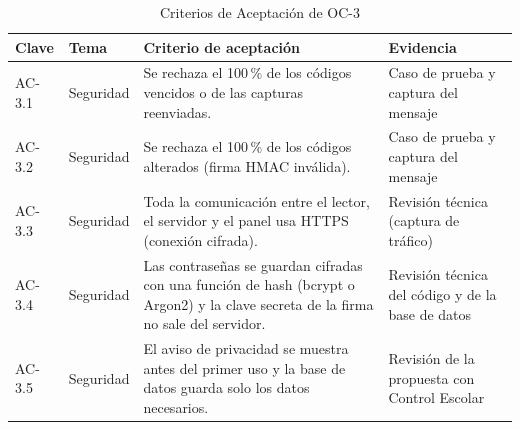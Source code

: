\begin{table}[tbp]
	\caption{Criterios de Aceptación de OC-3}
	\label{tab:ac1b}
	\small\setlength{\tabcolsep}{3pt}
	\begin{tabular}{P{1.2cm}P{2cm}P{7.6cm}P{4cm}}
		\toprule
		Clave & Tema & Criterio de aceptación & Evidencia \\
		\midrule
		AC-3.1 & Seguridad & Se rechaza el 100\,\% de los códigos vencidos o de las capturas reenviadas. & Caso de prueba y captura del mensaje \\
		AC-3.2 & Seguridad & Se rechaza el 100\,\% de los códigos alterados (firma HMAC inválida). & Caso de prueba y captura del mensaje \\
		AC-3.3 & Seguridad & Toda la comunicación entre el lector, el servidor y el panel usa HTTPS (conexión cifrada). & Revisión técnica (captura de tráfico) \\
		AC-3.4 & Seguridad & Las contraseñas se guardan cifradas con una función de hash (bcrypt o Argon2) y la clave secreta de la firma no sale del servidor. & Revisión técnica del código y de la base de datos \\
		AC-3.5 & Seguridad & El aviso de privacidad se muestra antes del primer uso y la base de datos guarda solo los datos necesarios. & Revisión de la propuesta con Control Escolar \\
		\bottomrule
	\end{tabular}
\end{table}

